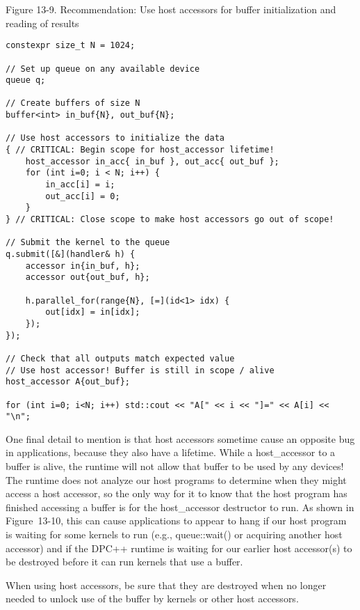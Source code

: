 \hspace*{\fill} \par %
Figure 13-9. Recommendation: Use host accessors for buffer initialization and reading of results
\begin{lstlisting}[caption={}]
constexpr size_t N = 1024;

// Set up queue on any available device
queue q;

// Create buffers of size N
buffer<int> in_buf{N}, out_buf{N};

// Use host accessors to initialize the data
{ // CRITICAL: Begin scope for host_accessor lifetime!
	host_accessor in_acc{ in_buf }, out_acc{ out_buf };
	for (int i=0; i < N; i++) {
		in_acc[i] = i;
		out_acc[i] = 0;
	}
} // CRITICAL: Close scope to make host accessors go out of scope!

// Submit the kernel to the queue
q.submit([&](handler& h) {
	accessor in{in_buf, h};
	accessor out{out_buf, h};
	
	h.parallel_for(range{N}, [=](id<1> idx) {
		out[idx] = in[idx];
	});
});

// Check that all outputs match expected value
// Use host accessor! Buffer is still in scope / alive
host_accessor A{out_buf};

for (int i=0; i<N; i++) std::cout << "A[" << i << "]=" << A[i] << "\n";
\end{lstlisting}

One final detail to mention is that host accessors sometime cause an opposite bug in applications, because they also have a lifetime. While a host\_accessor to a buffer is alive, the runtime will not allow that buffer to be used by any devices! The runtime does not analyze our host programs to determine when they might access a host accessor, so the only way for it to know that the host program has finished accessing a buffer is for the host\_accessor destructor to run. As shown in Figure 13-10, this can cause applications to appear to hang if our host program is waiting for some kernels to run (e.g., queue::wait() or acquiring another host accessor) and if the DPC++ runtime is waiting for our earlier host accessor(s) to be destroyed before it can run kernels that use a buffer.\par

\begin{tcolorbox}[colback=red!5!white,colframe=red!75!black]
When using host accessors, be sure that they are destroyed when no longer needed to unlock use of the buffer by kernels or other host accessors.
\end{tcolorbox}


